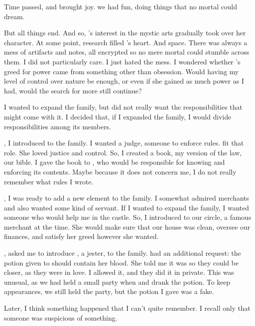 {Time passed, and brought joy.  we had fun, doing things that no mortal could dream.

But all things end. And so, 's interest in the mystic arts gradually took over her character. At some point, research filled 's heart. And space. There was always a mess of artifacts and notes, all encrypted so no mere mortal could stumble across them. I did not particularly care. I just hated the mess. I wondered whether 's greed for power came from something other than obsession. Would having my level of control over nature be enough, or even if she gained as much power as I had, would the search for more still continue?

I wanted to expand the family, but did not really want the responsibilities that might come with it. I decided that, if I expanded the family, I would divide responsibilities among its members.

, I introduced  to the family. I wanted a judge, someone to enforce rules.  fit that role. She loved justice and control. So, I created a book, my version of the law, our bible. I gave the book to , who would be responsible for knowing and enforcing its contents. Maybe because it does not concern me, I do not really remember what rules I wrote.

, I was ready to add a new element to the family. I somewhat admired merchants and also wanted some kind of servant. If I wanted to expand the family, I wanted someone who would help me in the castle. So, I introduced  to our circle, a famous merchant at the time. She would make sure that our house was clean, oversee our finances, and satisfy her greed however she wanted.

,  asked me to introduce , a jester, to the family.  had an additional request: the potion given to  should contain her blood. She told me it was so they could be closer, as they were in love. I allowed it, and they did it in private. This was unusual, as we had held a small party when  and  drank the potion. To keep appearances, we still held the party, but the potion I gave  was a fake.

Later, I think something happened that I can't quite remember. I recall only that someone was suspicious of something.

}
